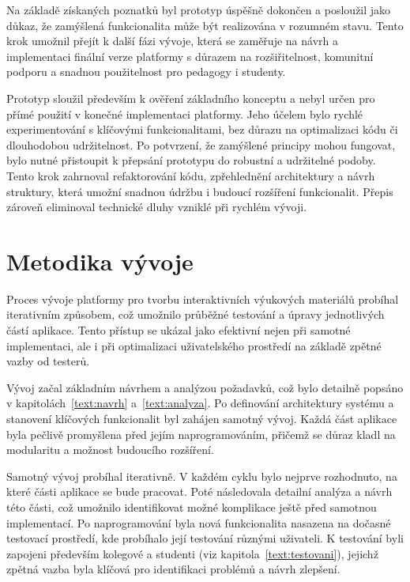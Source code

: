 Na základě získaných poznatků byl prototyp úspěšně dokončen a posloužil jako důkaz, že zamýšlená funkcionalita může být realizována v rozumném stavu. 
Tento krok umožnil přejít k další fázi vývoje, která se zaměřuje na návrh a implementaci finální verze platformy s důrazem na rozšiřitelnost, komunitní podporu a snadnou použitelnost pro pedagogy i studenty.

Prototyp sloužil především k ověření základního konceptu a nebyl určen pro přímé použití v konečné implementaci platformy. 
Jeho účelem bylo rychlé experimentování s klíčovými funkcionalitami, bez důrazu na optimalizaci kódu či dlouhodobou udržitelnost. 
Po potvrzení, že zamýšlené principy mohou fungovat, bylo nutné přistoupit k přepsání prototypu do robustní a udržitelné podoby. 
Tento krok zahrnoval refaktorování kódu, zpřehlednění architektury a návrh struktury, která umožní snadnou údržbu i budoucí rozšíření funkcionalit. 
Přepis zároveň eliminoval technické dluhy vzniklé při rychlém vývoji.

\section{Metodika vývoje}\label{text:realizace/metodikaVyvoje}

Proces vývoje platformy pro tvorbu interaktivních výukových materiálů probíhal iterativním způsobem, což umožnilo průběžné testování a úpravy jednotlivých částí aplikace. 
Tento přístup se ukázal jako efektivní nejen při samotné implementaci, ale i při optimalizaci uživatelského prostředí na základě zpětné vazby od testerů.

Vývoj začal základním návrhem a analýzou požadavků, což bylo detailně popsáno v kapitolách~\ref{text:navrh} a~\ref{text:analyza}. 
Po definování architektury systému a stanovení klíčových funkcionalit byl zahájen samotný vývoj. 
Každá část aplikace byla pečlivě promyšlena před jejím naprogramováním, přičemž se důraz kladl na modularitu a možnost budoucího rozšíření.

Samotný vývoj probíhal iterativně. 
V každém cyklu bylo nejprve rozhodnuto, na které části aplikace se bude pracovat. 
Poté následovala detailní analýza a návrh této části, což umožnilo identifikovat možné komplikace ještě před samotnou implementací. 
Po naprogramování byla nová funkcionalita nasazena na dočasné testovací prostředí, kde probíhalo její testování různými uživateli. 
K testování byli zapojeni především kolegové a studenti (viz kapitola~\ref{text:testovani}), jejichž zpětná vazba byla klíčová pro identifikaci problémů a návrh zlepšení.


